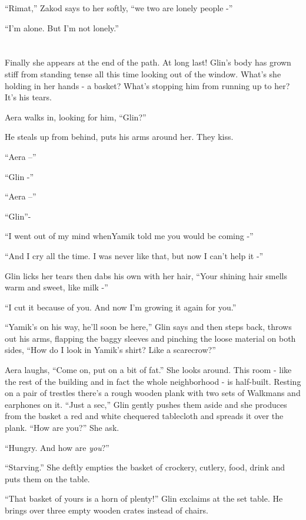 \documentclass[twoside,11pt]{book}
\begin{document}
``Rimat,'' Zakod says to her softly, ``we two are lonely people -''

``I'm alone. But I'm not lonely.''


\bigskip

\chapter{}

Finally she appears at the end of the path. At long last! Glin's body has grown stiff from standing
tense all this time looking out of the window. What's she holding in her
hands - a basket? What's stopping him from running up to her? It's his tears.

Aera walks in, looking for him, ``Glin?''

He steals up from behind, puts his arms around her. They kiss.

``Aera  --''

``Glin -''

``Aera  --''

``Glin''-

``I went out of my mind whenYamik told me you would be coming -''

``And I cry all the time. I was never like that, but now I can't help it -''

Glin licks her tears then dabs his own with her hair, ``Your
shining hair smells warm and sweet, like milk -''

``I cut it because of you. And now I'm growing it again for you.''

``Yamik's on his way, he'll soon be here,'' Glin says and then steps back, throws
out his arms, flapping the baggy sleeves and pinching the loose material on
both sides, ``How do I look in Yamik's shirt? Like a scarecrow?''

Aera laughs, ``Come on, put on a bit of fat.'' She looks around. This room - like the rest
of the building and in fact the whole neighborhood - is half-built.
Resting on a pair of trestles there's a rough wooden plank with two sets of Walkmans and earphones on it.
``Just a sec,'' Glin gently pushes them aside and she produces from the basket a red and
white chequered tablecloth and spreads it over the plank. ``How are you?'' She ask.

``Hungry. And how are \textit{you}?''

``Starving.'' She deftly empties the basket of crockery, cutlery, food, drink and puts them on
the table.

``That basket of yours is a horn of plenty!'' Glin exclaims at the set table. He brings over
three empty wooden crates instead of chairs.
\end{document}
